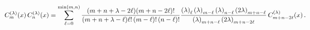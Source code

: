 \[\mathop{C^{(\lambda)}_{m}\/}\nolimits\!\left(x\right)\mathop{C^{(\lambda)}_{n}%
\/}\nolimits\!\left(x\right)=\sum_{\ell=0}^{\min(m,n)}\frac{(m+n+\lambda-2\ell%
)(m+n-2\ell)!}{(m+n+\lambda-\ell)\ell!\,(m-\ell)!\,(n-\ell)!}\*\frac{\left(%
\lambda\right)_{\ell}\left(\lambda\right)_{m-\ell}\left(\lambda\right)_{n-\ell%
}\left(2\lambda\right)_{m+n-\ell}}{\left(\lambda\right)_{m+n-\ell}\left(2%
\lambda\right)_{m+n-2\ell}}\mathop{C^{(\lambda)}_{m+n-2\ell}\/}\nolimits\!%
\left(x\right).\]